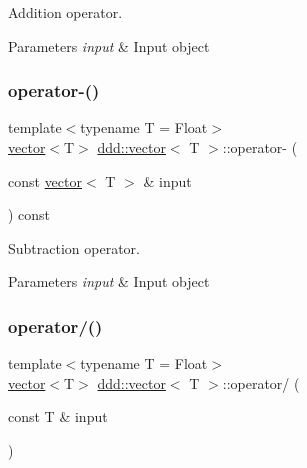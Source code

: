 Addition operator. 


\begin{DoxyParams}{Parameters}
{\em input} & Input object \\
\hline
\end{DoxyParams}
\mbox{\label{classddd_1_1vector_aa047958a3d0cf3d3ff3d6ff571920ae0}} 
\subsubsection{\texorpdfstring{operator-\/()}{operator-()}}
{\footnotesize\ttfamily template$<$typename T = Float$>$ \\
\hyperlink{classddd_1_1vector}{vector}$<$T$>$ \hyperlink{classddd_1_1vector}{ddd\+::vector}$<$ T $>$\+::operator-\/ (\begin{DoxyParamCaption}\item[{const \hyperlink{classddd_1_1vector}{vector}$<$ T $>$ \&}]{input }\end{DoxyParamCaption}) const\hspace{0.3cm}{\ttfamily [inline]}}



Subtraction operator. 


\begin{DoxyParams}{Parameters}
{\em input} & Input object \\
\hline
\end{DoxyParams}
\mbox{\label{classddd_1_1vector_a837824860826c44950c2c48d4bd247e3}} 
\subsubsection{\texorpdfstring{operator/()}{operator/()}}
{\footnotesize\ttfamily template$<$typename T = Float$>$ \\
\hyperlink{classddd_1_1vector}{vector}$<$T$>$ \hyperlink{classddd_1_1vector}{ddd\+::vector}$<$ T $>$\+::operator/ (\begin{DoxyParamCaption}\item[{const T \&}]{input }\end{DoxyParamCaption})\hspace{0.3cm}{\ttfamily [inline]}}



